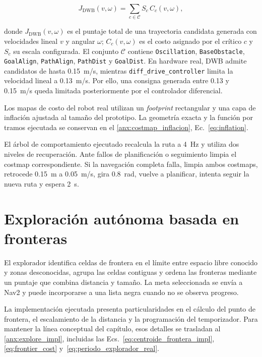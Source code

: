 \begin{equation}
J_{\mathrm{DWB}}(v,\omega)
=
\sum_{c\in\mathcal{C}}
S_c\,C_c(v,\omega),
\label{eq:dwb_cost}
\end{equation}

\noindent donde $J_{\mathrm{DWB}}(v,\omega)$ es el puntaje total de una trayectoria candidata generada con velocidades lineal $v$ y angular $\omega$; $C_c(v,\omega)$ es el costo asignado por el crítico $c$ y $S_c$ su escala configurada. El conjunto $\mathcal{C}$ contiene \texttt{Oscillation}, \texttt{BaseObstacle}, \texttt{GoalAlign}, \texttt{PathAlign}, \texttt{PathDist} y \texttt{GoalDist}. En hardware real, DWB admite candidatos de hasta 0.15~m/s, mientras \texttt{diff\_drive\_controller} limita la velocidad lineal a 0.13~m/s. Por ello, una consigna generada entre 0.13 y 0.15~m/s queda limitada posteriormente por el controlador diferencial.

Los mapas de costo del robot real utilizan un \textit{footprint}
rectangular y una capa de inflación ajustada al tamaño del prototipo. La
geometría exacta y la función por tramos ejecutada se conservan en el
\ref{anx:costmap_inflacion}, Ec.~\eqref{eq:inflation}.

El árbol de comportamiento ejecutado recalcula la ruta a 4~Hz y utiliza dos niveles de recuperación. Ante fallos de planificación o seguimiento limpia el costmap correspondiente. Si la navegación completa falla, limpia ambos costmaps, retrocede 0.15~m a 0.05~m/s, gira 0.8~rad, vuelve a planificar, intenta seguir la nueva ruta y espera 2~s.

\section{Exploración autónoma basada en fronteras}
\label{sec:exploracion_marco}

El explorador identifica celdas de frontera en el límite entre
espacio libre conocido y zonas desconocidas, agrupa las celdas contiguas y
ordena las fronteras mediante un puntaje que combina distancia y tamaño. La
meta seleccionada se envía a Nav2 y puede incorporarse a una lista negra cuando
no se observa progreso.

La implementación ejecutada presenta particularidades en el cálculo del punto
de frontera, el escalamiento de la distancia y la programación del temporizador.
Para mantener la línea conceptual del capítulo, esos detalles se trasladan al
\ref{anx:explore_impl}, incluidas las Ecs.~\eqref{eq:centroide_frontera_impl},
\eqref{eq:frontier_cost} y~\eqref{eq:periodo_explorador_real}.

